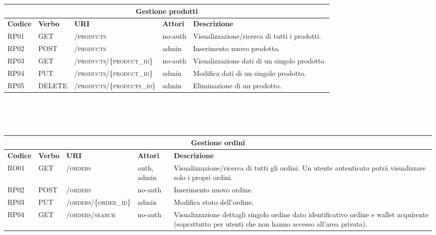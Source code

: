 \hspace*{-2cm}
\begin{tabular}{ |p{1.2cm}|p{1.5cm}|p{5cm}|p{2cm}|p{6cm}| }
    \hline
    \multicolumn{5}{|c|}{\textbf{Gestione prodotti}}\\
    \hline
    \hline
    \textbf{Codice} & \textbf{Verbo} & \textbf{URI} & \textbf{Attori} & \textbf{Descrizione}\\
    \hline
    RP01 & GET & \textsc{/products} & no-auth & Visualizzazione/ricerca di tutti i prodotti.\\
    \hline
    RP02 & POST & \textsc{/products} & admin & Inserimento nuovo prodotto.\\
    \hline
    RP03 & GET & \textsc{/products/\{product\_id\}} & no-auth & Visualizzazione dati di un singolo prodotto.\\
    \hline
    RP04 & PUT & \textsc{/products/\{product\_id\}} & admin & Modifica dati di un singolo prodotto.\\
    \hline
    RP05 & DELETE & \textsc{/products/\{products\_id\}} & admin & Eliminazione di un prodotto.\\
    \hline
\end{tabular}
\\\\\\
\hspace*{-2cm}
\begin{tabular}{ |p{1.2cm}|p{1.5cm}|p{5cm}|p{2cm}|p{6cm}| }
    \hline
    \multicolumn{5}{|c|}{\textbf{Gestione ordini}}\\
    \hline
    \hline
    \textbf{Codice} & \textbf{Verbo} & \textbf{URI} & \textbf{Attori} & \textbf{Descrizione}\\
    \hline
    RO01 & GET & \textsc{/orders} & auth, admin & Visualizzazione/ricerca di tutti gli ordini. Un utente autenticato potrà visualizzare solo i propri ordini.\\
    \hline
    RP02 & POST & \textsc{/orders} & no-auth & Inserimento nuovo ordine.\\
    \hline
    RP03 & PUT & \textsc{/orders/\{order\_id\}} & admin & Modifica stato dell'ordine.\\
    \hline
    RP04 & GET & \textsc{/orders/search} & no-auth & Visualizzazione dettagli singolo ordine dato identificativo ordine e wallet acquirente (soprattutto per utenti che non hanno accesso all'area privata).\\
    \hline
\end{tabular}
\\\\\\
